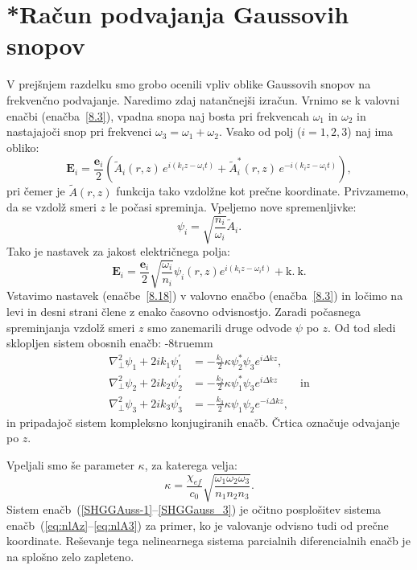 \section{{*}Račun podvajanja Gaussovih snopov}
V prejšnjem razdelku smo grobo ocenili vpliv oblike Gaussovih snopov
na frekvenčno podvajanje. Naredimo zdaj natančnejši izračun. Vrnimo se k valovni
enačbi (enačba~\ref{8.3}), vpadna snopa naj bosta pri frekvencah
$\omega_{1}$ in $\omega_{2}$ in nastajajoči snop pri frekvenci
$\omega_{3}=\omega_{1}+\omega_{2}$.
Vsako od polj ($i=1,2,3$) naj ima obliko:
\begin{equation}
\mathbf{E}_{i}  = \frac{\mathbf{e}_{i}}{2}\left(\tilde{A}_{i}(r,z)\, 
e^{i(k_{i}z-\omega_{i}t)}+\tilde{A}_{i}^{*}(r,z)\, e^{-i(k_{i}z-\omega_{i}t)}\right)\!\!,
\end{equation}
pri čemer je $\tilde{A}(r,z)$ funkcija tako vzdolžne kot prečne koordinate. Privzamemo, 
da se vzdolž smeri  $z$ le počasi spreminja.
Vpeljemo nove spremenljivke:
\begin{equation}
\psi_i = \sqrt{\frac{n_i}{\omega_i}}\tilde{A}_i.
\end{equation}
Tako je nastavek za jakost električnega polja:
\begin{equation}
\mathbf{E}_{i}=\frac{\mathbf{e}_{i}}{2}\sqrt{\frac{\omega_{i}}{n_{i}}}\psi_{i}(r,z)
e^{i(k_{i}z-\omega_{i}t)}+\mathrm{k.~k.}
\label{8.18}
\end{equation}
Vstavimo nastavek (enačbe~\ref{8.18}) v valovno
enačbo (enačba~\ref{8.3}) in ločimo na levi in desni strani člene z enako časovno odvisnostjo.
Zaradi počasnega spreminjanja vzdolž smeri $z$ smo zanemarili druge odvode 
$\psi$ po $z$. Od tod sledi sklopljen sistem obosnih enačb:
\vglue-8truemm
\begin{align}
\nabla_{\perp}^{2}\psi_{1}+2ik_{1}\psi_{1}^{\prime} & =  -
\frac{k_{1}}{2}\kappa\psi_{2}^{\ast}\psi_{3}e^{i\Delta kz},\label{SHGGAuss-1}\\
\nabla_{\perp}^{2}\psi_{2}+2ik_{2}\psi_{2}^{\prime} & =  -
\frac{k_{2}}{2}\kappa\psi_{1}^{\ast}\psi_{3}e^{i\Delta kz} \qquad \mathrm{in}\\
\nabla_{\perp}^{2}\psi_{3}+2ik_{3}\psi_{3}^{\prime} & =
 - \frac{k_{3}}{2}\kappa\psi_{1}\psi_{2}e^{-i\Delta kz},
\label{SHGGauss_3}
\end{align}
in pripadajoč sistem kompleksno konjugiranih enačb. 
Črtica označuje odvajanje po $z$. 

Vpeljali smo še parameter $\kappa$, za katerega velja:
\begin{equation}
\kappa=\frac{\chi_{ef}}{c_0} \sqrt{\frac{\omega_{1}\omega_{2}\omega_{3}}{n_{1}n_{2}n_{3}}}.
\label{8.20}
\end{equation}
Sistem enačb~(\ref{SHGGAuss-1}--\ref{SHGGauss_3}) je očitno
posplošitev sistema enačb~(\ref{eq:nlAz}--\ref{eq:nlA3}) za primer, ko je valovanje odvisno
tudi od prečne koordinate. Reševanje tega nelinearnega sistema parcialnih
diferencialnih enačb je na splošno zelo zapleteno.

